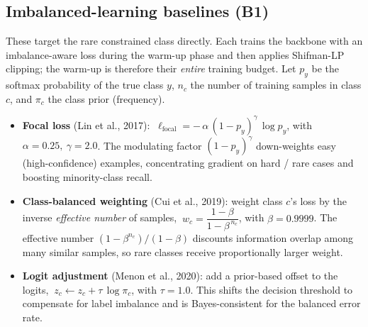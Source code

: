 \documentclass[11pt,a4paper]{article}
\begin{document}
\subsection{Imbalanced-learning baselines (B1)}
These target the rare constrained class directly. Each trains the backbone with an imbalance-aware loss during
the warm-up phase and then applies Shifman-LP clipping; the warm-up is therefore their \emph{entire} training
budget. Let $p_y$ be the softmax probability of the true class $y$, $n_c$ the number of training samples in
class $c$, and $\pi_c$ the class prior (frequency).
\begin{itemize}
\item \textbf{Focal loss} (Lin et al., 2017): $\ \ell_{\text{focal}} = -\,\alpha\,(1-p_y)^{\gamma}\,\log p_y$,
with $\alpha=0.25,\ \gamma=2.0$. The modulating factor $(1-p_y)^\gamma$ down-weights easy (high-confidence)
examples, concentrating gradient on hard / rare cases and boosting minority-class recall.
\item \textbf{Class-balanced weighting} (Cui et al., 2019): weight class $c$'s loss by the inverse
\emph{effective number} of samples, $\ w_c = \dfrac{1-\beta}{1-\beta^{\,n_c}}$, with $\beta=0.9999$. The
effective number $(1-\beta^{n_c})/(1-\beta)$ discounts information overlap among many similar samples, so rare
classes receive proportionally larger weight.
\item \textbf{Logit adjustment} (Menon et al., 2020): add a prior-based offset to the logits,
$\ z_c \leftarrow z_c + \tau\,\log \pi_c$, with $\tau=1.0$. This shifts the decision threshold to compensate
for label imbalance and is Bayes-consistent for the balanced error rate.
\end{itemize}

\end{document}
